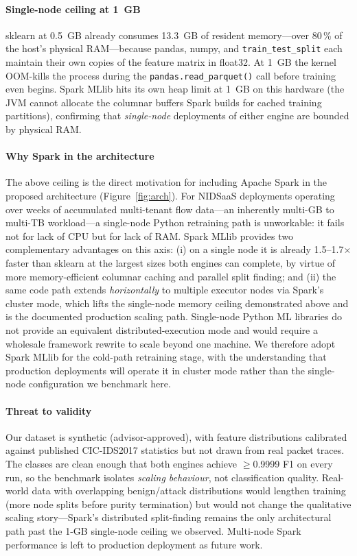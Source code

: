 \paragraph{Single-node ceiling at 1~GB} sklearn at 0.5~GB already
consumes 13.3~GB of resident memory---over 80\,\% of the host's
physical RAM---because pandas, numpy, and \texttt{train\_test\_split}
each maintain their own copies of the feature matrix in float32.
At 1~GB the kernel OOM-kills the process during the
\texttt{pandas.read\_parquet()} call before training even begins.
Spark MLlib hits its own heap limit at 1~GB on this hardware (the
JVM cannot allocate the columnar buffers Spark builds for cached
training partitions), confirming that \emph{single-node} deployments
of either engine are bounded by physical RAM.

\paragraph{Why Spark in the architecture} The above ceiling is the
direct motivation for including Apache Spark in the proposed
architecture (Figure~\ref{fig:arch}). For NIDSaaS deployments
operating over weeks of accumulated multi-tenant flow data---an
inherently multi-GB to multi-TB workload---a single-node Python
retraining path is unworkable: it fails not for lack of CPU but for
lack of RAM. Spark MLlib provides two complementary advantages on
this axis: (i) on a single node it is already
1.5--1.7$\times$ faster than sklearn at the largest sizes both
engines can complete, by virtue of more memory-efficient columnar
caching and parallel split finding; and (ii) the same code path
extends \emph{horizontally} to multiple executor nodes via Spark's
cluster mode, which lifts the single-node memory ceiling
demonstrated above and is the documented production scaling path.
Single-node Python ML libraries do not provide an equivalent
distributed-execution mode and would require a wholesale framework
rewrite to scale beyond one machine. We therefore adopt Spark MLlib
for the cold-path retraining stage, with the understanding that
production deployments will operate it in cluster mode rather than
the single-node configuration we benchmark here.

\paragraph{Threat to validity}\label{sec:retraining-threats}
Our dataset is synthetic (advisor-approved), with feature
distributions calibrated against published CIC-IDS2017 statistics
but not drawn from real packet traces. The classes are clean enough
that both engines achieve $\geq$0.9999 F1 on every run, so the
benchmark isolates \emph{scaling behaviour}, not classification
quality. Real-world data with overlapping benign/attack distributions
would lengthen training (more node splits before purity termination)
but would not change the qualitative scaling story---Spark's
distributed split-finding remains the only architectural path past
the 1-GB single-node ceiling we observed. Multi-node Spark
performance is left to production deployment as future work.

